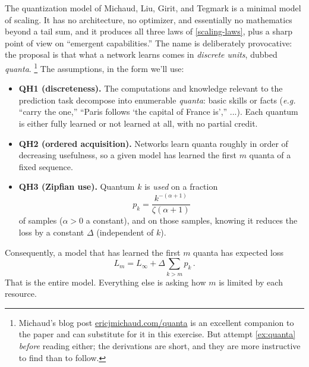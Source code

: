 \documentclass[11pt]{article}
\begin{document}
The quantization model of Michaud, Liu, Girit, and Tegmark \cite{michaud2023quantization} is a minimal model of scaling. It has no architecture, no optimizer, and essentially no mathematics beyond a tail sum, and it produces all three laws of \eqref{scaling-laws}, plus a sharp point of view on ``emergent capabilities.'' The name is deliberately provocative: the proposal is that what a network learns comes in \emph{discrete units}, dubbed \emph{quanta}.%
%
\footnote{Michaud's blog post \href{https://ericjmichaud.com/quanta/}{ericjmichaud.com/quanta} is an excellent companion to the paper and can substitute for it in this exercise. But attempt \cref{ex:quanta} \emph{before} reading either; the derivations are short, and they are more instructive to find than to follow.} %
%
The assumptions, in the form we'll use:
%
\begin{itemize}
    \item \textbf{QH1 (discreteness).} The computations and knowledge relevant to the prediction task decompose into enumerable \emph{quanta}: basic skills or facts (\emph{e.g.} ``carry the one,'' ``Paris follows `the capital of France is','' ...). Each quantum is either fully learned or not learned at all, with no partial credit.
    \item \textbf{QH2 (ordered acquisition).} Networks learn quanta roughly in order of decreasing usefulness, so a given model has learned the first $m$ quanta of a fixed sequence.
    \item \textbf{QH3 (Zipfian use).} Quantum $k$ is \emph{used} on a fraction
    \begin{equation} \label{zipf}
        p_k = \frac{k^{-(\alpha+1)}}{\zeta(\alpha+1)}
    \end{equation}
    of samples ($\alpha>0$ a constant), and on those samples, knowing it reduces the loss by a constant $\Delta$ (independent of $k$).
\end{itemize}
%
Consequently, a model that has learned the first $m$ quanta has expected loss
%
\begin{equation} \label{quanta-loss}
    L_m = L_\infty + \Delta \sum_{k>m} p_k\,.
\end{equation}
%
That is the entire model. Everything else is asking how $m$ is limited by each resource.
\end{document}
